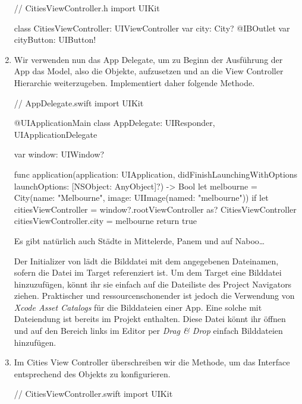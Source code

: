 \documentclass[parskip=half, final]{scrreprt}
\begin{document}
\begin{lecture}
\begin{enumerate}
\begin{swiftcode}
// CitiesViewController.h
import UIKit

class CitiesViewController: UIViewController {
    var city: City?
    @IBOutlet var cityButton: UIButton!
}
\end{swiftcode}

\item Wir verwenden nun das App Delegate, um zu Beginn der Ausführung der App das Model, also die  Objekte, aufzusetzen und an die View Controller Hierarchie weiterzugeben. Implementiert daher folgende  Methode.

\begin{swiftcode}
// AppDelegate.swift
import UIKit

@UIApplicationMain
class AppDelegate: UIResponder, UIApplicationDelegate {
    var window: UIWindow?
    
    func application(application: UIApplication, didFinishLaunchingWithOptions launchOptions: [NSObject: AnyObject]?) -> Bool {
        let melbourne = City(name: "Melbourne", image: UIImage(named: "melbourne"))
        if let citiesViewController = window?.rootViewController as? CitiesViewController {
            citiesViewController.city = melbourne
        }
        return true
    }
}

\end{swiftcode}

Es gibt natürlich auch Städte in Mittelerde, Panem und auf Naboo…

 Der Initializer  von  lädt die Bilddatei mit dem angegebenen Dateinamen, sofern die Datei im Target referenziert ist. Um dem Target eine Bilddatei hinzuzufügen, könnt ihr sie einfach auf die Dateiliste des Project Navigators ziehen. Praktischer und ressourcenschonender ist jedoch die Verwendung von \emph{Xcode Asset Catalogs} für die Bilddateien einer App. Eine solche mit Dateiendung  ist bereits im Projekt enthalten. Diese Datei könnt ihr öffnen und auf den Bereich links im Editor per \emph{Drag \& Drop} einfach Bilddateien hinzufügen.

\item Im Cities View Controller überschreiben wir die  Methode, um das Interface entsprechend des  Objekts zu konfigurieren.

\begin{swiftcode}
// CitiesViewController.swift
import UIKit


\end{swiftcode}
\end{enumerate}
\end{lecture}
\end{document}

